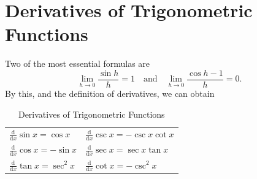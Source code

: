 \section{Derivatives of Trigonometric Functions}
Two of the most essential formulas are 
\[
    \lim_{h \to 0} \frac{\sin h}{h} = 1 \quad \text{and} \quad \lim_{h \to 0} \frac{\cos h - 1}{h} = 0.   
\]
By this, and the definition of derivatives, we can obtain
\begin{table}[H]
    \centering
    \begin{tabular}{ll}
        \toprule
            \(\frac{\mathrm{d}}{\mathrm{d}x} \sin x = \cos x \)  & \(\frac{\mathrm{d}}{\mathrm{d}x} \csc x = - \csc x \cot x \)   \\
            \(\frac{\mathrm{d}}{\mathrm{d}x} \cos x = -\sin x \)  & \(\frac{\mathrm{d}}{\mathrm{d}x} \sec x = \sec x \tan x\)   \\
            \(\frac{\mathrm{d}}{\mathrm{d}x} \tan x = \sec ^2 x\)  & \(\frac{\mathrm{d}}{\mathrm{d}x} \cot x = - \csc ^2 x\)   \\
        \bottomrule
    \end{tabular}
    \caption{Derivatives of Trigonometric Functions}
    \label{tab:d of trig}
\end{table} 

